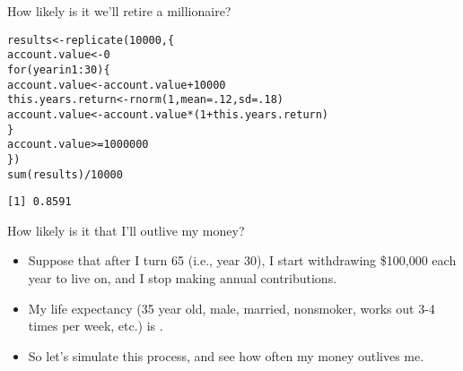 \documentclass{beamer}\usepackage[]{graphicx}\usepackage[]{color}
\makeatletter
\newcommand{\hlnum}[1]{\textcolor[rgb]{0.824,0.412,0.118}{#1}}%
\newcommand{\hlopt}[1]{\textcolor[rgb]{1,0.894,0.769}{#1}}%
\newcommand{\hlstd}[1]{\textcolor[rgb]{1,0.894,0.769}{#1}}%
\newcommand{\hlkwa}[1]{\textcolor[rgb]{0.941,0.902,0.549}{#1}}%
\newcommand{\hlkwb}[1]{\textcolor[rgb]{0.804,0.776,0.451}{#1}}%
\newcommand{\hlkwc}[1]{\textcolor[rgb]{0.78,0.941,0.545}{#1}}%
\newcommand{\hlkwd}[1]{\textcolor[rgb]{1,0.78,0.769}{#1}}%
\newenvironment{kframe}{%
 \def\at@end@of@kframe{}%
 \ifinner\ifhmode%
  \def\at@end@of@kframe{\end{minipage}}%
  \begin{minipage}{\columnwidth}%
 \fi\fi%
 \def\FrameCommand##1{\hskip\@totalleftmargin \hskip-\fboxsep
 \colorbox{shadecolor}{##1}\hskip-\fboxsep
     \hskip-\linewidth \hskip-\@totalleftmargin \hskip\columnwidth}%
 \MakeFramed {\advance\hsize-\width
   \@totalleftmargin\z@ \linewidth\hsize
   \@setminipage}}%
 {\par\unskip\endMakeFramed%
 \at@end@of@kframe}
\newenvironment{knitrout}{}{} %
\makeatother
\begin{document}
\begin{darkframes}
    \begin{frame}[fragile]{How likely is it we'll retire a millionaire?}
      \fontsize{9}{9}\selectfont
\begin{knitrout}
\begin{kframe}
\begin{alltt}
\hlstd{results} \hlkwb{<-} \hlkwd{replicate}\hlstd{(}\hlnum{10000}\hlstd{, \{}
  \hlstd{account.value} \hlkwb{<-} \hlnum{0}
  \hlkwa{for} \hlstd{(year} \hlkwa{in} \hlnum{1}\hlopt{:}\hlnum{30}\hlstd{) \{}
    \hlstd{account.value} \hlkwb{<-} \hlstd{account.value} \hlopt{+} \hlnum{10000}
    \hlstd{this.years.return} \hlkwb{<-} \hlkwd{rnorm}\hlstd{(}\hlnum{1}\hlstd{,} \hlkwc{mean}\hlstd{=}\hlnum{.12}\hlstd{,} \hlkwc{sd}\hlstd{=}\hlnum{.18}\hlstd{)}
    \hlstd{account.value} \hlkwb{<-} \hlstd{account.value} \hlopt{*} \hlstd{(}\hlnum{1} \hlopt{+} \hlstd{this.years.return)}
  \hlstd{\}}
  \hlstd{account.value} \hlopt{>=} \hlnum{1000000}
\hlstd{\})}
\hlkwd{sum}\hlstd{(results)} \hlopt{/} \hlnum{10000}
\end{alltt}
\begin{verbatim}
[1] 0.8591
\end{verbatim}
\end{kframe}
\end{knitrout}
    \end{frame}

    \begin{frame}{How likely is it that I'll outlive my money?}
      \begin{itemize}[<+->]
        \item Suppose that after I turn 65 (i.e., year 30), I start withdrawing \$100,000 each year to live on, and I stop making annual contributions.
        \item My life expectancy (35 year old, male, married, nonsmoker, works out 3-4 times per week, etc.) is .
        \item So let's simulate this process, and see how often my money outlives me.
      \end{itemize}
    \end{frame}


\end{darkframes}
\end{document}
